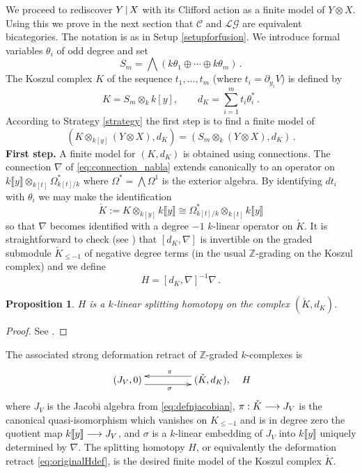 \documentclass[english,letter paper,12pt,leqno]{article}
\newtheorem{proposition}[theorem]{Proposition}
\theoremstyle{example}
\numberwithin{equation}{section}
\def\LG{\mathcal{LG}}
\def\nZ{\mathds{Z}}
\def\L{\mathcal{C}}
\begin{document}
We proceed to rediscover $Y \,|\, X$ with its Clifford action as a finite model of $Y \otimes X$. Using this we prove in the next section that $\L$ and $\LG$ are equivalent bicategories. The notation is as in Setup \ref{setupforfusion}. We introduce formal variables $\theta_i$ of odd degree and set
\[
S_m = \bigwedge\left( k \theta_1 \oplus \cdots \oplus k \theta_m \right)\,.
\]
The Koszul complex $K$ of the sequence $t_1,\ldots,t_m$ (where $t_i = \partial_{y_i} V$) is defined by
\begin{equation}\label{defn:koszul2}
K = S_m \otimes_k k[y], \qquad d_K = \sum_{i=1}^m t_i \theta_i^*\,.
\end{equation}
According to Strategy \ref{strategy} the first step is to find a finite model of
\[
( K \otimes_{k[y]} ( Y \otimes X ), d_K ) = ( S_m \otimes_k ( Y \otimes X ), d_K )\,.
\]
\textbf{First step.} A finite model for $(K, d_K)$ is obtained using connections. The connection $\nabla$ of \eqref{eq:connection_nabla} extends canonically to an operator on $k\llbracket y \rrbracket \otimes_{k[t]} \Omega^*_{k[t]/k}$ where $\Omega^* = \bigwedge \Omega^1$ is the exterior algebra. By identifying $d t_i$ with $\theta_i$ we may make the identification
\[
\check{K} := K \otimes_{k[y]} k\llbracket y \rrbracket \cong \Omega^*_{k[t]/k} \otimes_{k[t]} k\llbracket y \rrbracket 
\]
so that $\nabla$ becomes identified with a degree $-1$ $k$-linear operator on $\check{K}$.  It is straightforward to check (see \cite[Lemma 8.7]{dm1102.2957}) that $[d_K, \nabla]$ is invertible on the graded submodule $\check{K}_{\le -1}$ of negative degree terms (in the usual $\nZ$-grading on the Koszul complex) and we define
\[
H = [d_K, \nabla]^{-1} \nabla\,.
\]

\begin{proposition} $H$ is a $k$-linear splitting homotopy on the complex $(\check{K},d_K)$.
\end{proposition}
\begin{proof}
See \cite[Section 8.1]{dm1102.2957}.
\end{proof}

The associated strong deformation retract of $\mathbb{Z}$-graded $k$-complexes is
\begin{equation}\label{eq:originalHdef}
\xymatrix@C+2pc{
(J_V,0) \ar@<-1ex>[r]_{\sigma} & (\check{K}, d_K), \ar@<-1ex>[l]_{\pi}
} \quad H
\end{equation}
where $J_V$ is the Jacobi algebra from \eqref{eq:defnjacobian}, $\pi: \check{K} \longrightarrow J_V$ is the canonical quasi-isomorphism which vanishes on $K_{\le -1}$ and is in degree zero the quotient map $k\llbracket y \rrbracket \longrightarrow J_V$, and $\sigma$ is a $k$-linear embedding of $J_V$ into $k\llbracket y \rrbracket$ uniquely determined by $\nabla$. The splitting homotopy $H$, or equivalently the deformation retract \eqref{eq:originalHdef}, is the desired finite model of the Koszul complex $\check{K}$.
\end{document}
